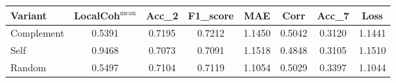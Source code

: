\begin{tabular}{lccccccc}
\toprule
Variant & LocalCoh$^\text{mean}$ & Acc_2 & F1_score & MAE & Corr & Acc_7 & Loss \\
\midrule
Complement & 0.5391 & 0.7195 & 0.7212 & 1.1450 & 0.5042 & 0.3120 & 1.1441 \\
Self & 0.9468 & 0.7073 & 0.7091 & 1.1518 & 0.4848 & 0.3105 & 1.1510 \\
Random & 0.5497 & 0.7104 & 0.7119 & 1.1054 & 0.5029 & 0.3397 & 1.1044 \\
\bottomrule
\end{tabular}